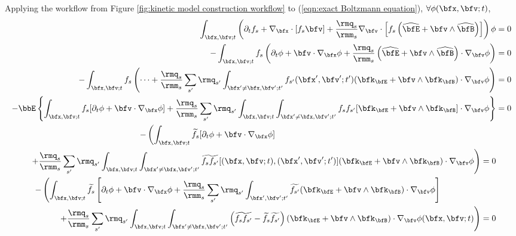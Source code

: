     Applying the workflow from Figure \ref{fig:kinetic model construction workflow} to (\ref{eqn:exact Boltzmann equation}), $\forall \phi(\bfx, \bfv; t)$,
    {\small \begin{align}
        \int_{\bfx, \bfv; t}\left(\partial_{t}f_{s} + \nabla_{\bfx}\cdot[f_{s}\bfv] + \frac{\rmq_{s}}{\rmm_{s}}\nabla_{\bfv}\cdot\left[f_{s}\left(\widehat{\bfE} + \bfv\wedge\widehat{\bfB}\right)\right]\right)\phi  &=  0  \\
        - \int_{\bfx, \bfv; t}f_{s}\left(\partial_{t}\phi + \bfv\cdot\nabla_{\bfx}\phi + \frac{\rmq_{s}}{\rmm_{s}}\left(\widehat{\bfE} + \bfv\wedge\widehat{\bfB}\right)\cdot\nabla_{\bfv}\phi\right)  &=  0  \\
        - \int_{\bfx, \bfv; t}f_{s}\left(\cdots + \frac{\rmq_{s}}{\rmm_{s}}\sum_{s'}\rmq_{s'}\int_{\bfx' \neq \bfx, \bfv'; t'}f_{s'}(\bfx', \bfv'; t')(\bfk_{\bfE} + \bfv\wedge\bfk_{\bfB})\cdot\nabla_{\bfv}\phi\right)  &=  0  \\
        - \bbE\left\{\int_{\bfx, \bfv; t}f_{s}[\partial_{t}\phi + \bfv\cdot\nabla_{\bfx}\phi] + \frac{\rmq_{s}}{\rmm_{s}}\sum_{s'}\rmq_{s'}\int_{\bfx, \bfv; t}\int_{\bfx' \neq \bfx, \bfv'; t'}f_{s}f_{s'}[\bfk_{\bfE}  + \bfv\wedge\bfk_{\bfB}]\cdot\nabla_{\bfv}\phi\right\}  &=  0  \\
        \begin{split}
            - \left(\int_{\bfx, \bfv; t}\widetilde{f_{s}}[\partial_{t}\phi + \bfv\cdot\nabla_{\bfx}\phi]\right.  \;\;\;\;\;\;\;\;\;\;\;\;\;\;\;\;\;\;\;\;\;\;\;\;\;\;\;\;\;\;\;\;\;\;\;\;\;\;\;\;\;\;\;\;\;\;\;\;\;\;\;\;\;\;\;\;\;\;\;\;\;\;\;\;\;\;\;\;\;\;\;\;\;\;\;\;\;\;\;\;\;\;\;\;\;\;\;\;&\;  \\
            \left.  + \frac{\rmq_{s}}{\rmm_{s}}\sum_{s'}\rmq_{s'}\int_{\bfx, \bfv; t}\int_{\bfx' \neq \bfx, \bfv'; t'}\widetilde{f_{s}f_{s'}}[(\bfx, \bfv; t), (\bfx', \bfv'; t')](\bfk_{\bfE}  + \bfv\wedge\bfk_{\bfB})\cdot\nabla_{\bfv}\phi\right)  &=  0
        \end{split}  \\
        \begin{split}
            - \left(\int_{\bfx, \bfv; t}\widetilde{f_{s}}\left[\partial_{t}\phi + \bfv\cdot\nabla_{\bfx}\phi + \frac{\rmq_{s}}{\rmm_{s}}\sum_{s'}\rmq_{s'}\int_{\bfx', \bfv'; t'}\widetilde{f_{s'}}(\bfk_{\bfE}  + \bfv\wedge\bfk_{\bfB})\cdot\nabla_{\bfv}\phi\right]\right.  \;\;\;\;\;\;\;\;\;\;\;\;\;\;\;\;\;&\;  \\
            \left.  + \frac{\rmq_{s}}{\rmm_{s}}\sum_{s'}\rmq_{s'}\int_{\bfx, \bfv; t}\int_{\bfx' \neq \bfx, \bfv'; t'}\left(\widetilde{f_{s}f_{s'}} - \widetilde{f_{s}}\widetilde{f_{s'}}\right)(\bfk_{\bfE}  + \bfv\wedge\bfk_{\bfB})\cdot\nabla_{\bfv}\phi(\bfx, \bfv; t)\right)  &=  0
        \end{split}
    \end{align}}
